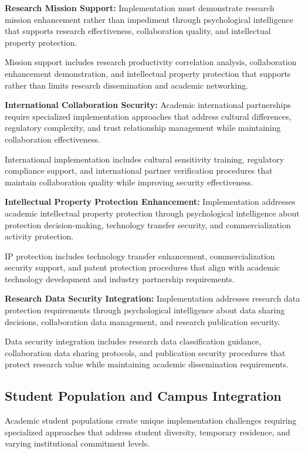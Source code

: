 \documentclass[10pt, twocolumn]{article}
\begin{document}
\textbf{Research Mission Support:} Implementation must demonstrate research mission enhancement rather than impediment through psychological intelligence that supports research effectiveness, collaboration quality, and intellectual property protection.

Mission support includes research productivity correlation analysis, collaboration enhancement demonstration, and intellectual property protection that supports rather than limits research dissemination and academic networking.

\textbf{International Collaboration Security:} Academic international partnerships require specialized implementation approaches that address cultural differences, regulatory complexity, and trust relationship management while maintaining collaboration effectiveness.

International implementation includes cultural sensitivity training, regulatory compliance support, and international partner verification procedures that maintain collaboration quality while improving security effectiveness.

\textbf{Intellectual Property Protection Enhancement:} Implementation addresses academic intellectual property protection through psychological intelligence about protection decision-making, technology transfer security, and commercialization activity protection.

IP protection includes technology transfer enhancement, commercialization security support, and patent protection procedures that align with academic technology development and industry partnership requirements.

\textbf{Research Data Security Integration:} Implementation addresses research data protection requirements through psychological intelligence about data sharing decisions, collaboration data management, and research publication security.

Data security integration includes research data classification guidance, collaboration data sharing protocols, and publication security procedures that protect research value while maintaining academic dissemination requirements.

\subsection{Student Population and Campus Integration}

Academic student populations create unique implementation challenges requiring specialized approaches that address student diversity, temporary residence, and varying institutional commitment levels.
\end{document}
